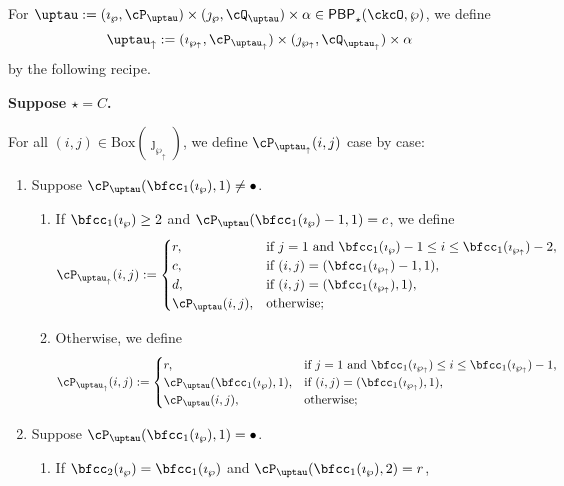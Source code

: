 \documentclass[12pt,a4paper]{amsart}
\numberwithin{equation}{section}
\theoremstyle{remark}
\def\BOX#1{\mathrm{Box}(#1)}
\def\PBP{\mathsf{PBP}}
\def\PBPop#1#2#3#4{\PBP_{#1}^{#2}(#3,#4)}
\newcommand{\PBPOP}[1][]{\PBPop{\star}{#1}{\ckcO}{\wp}}
\def\wpu{\wp_{\uparrow}}
\def\wpd{\wp} %
\def\uptauu{\uptau_{\uparrow}}
\def\uptaud{\uptau} %
\begin{document}
 For
 $\uptau := (\imath_{\wp},\cP_{\uptau})\times (\jmath_{\wp},\cQ_{\uptau})\times \alpha \in \PBPOP $,
 we
 define
 \[
   \uptauu:= (\imath_{\wpu}, \cP_{\uptauu})\times (\jmath_{\wpu},\cQ_{\uptauu})\times \alpha
 \]
 by the following recipe.

 {\bfseries Suppose $\star = C$.}

 \newcommand{\localtextbulletone}{\textcolor{black}{\raisebox{.45ex}{\rule{.6ex}{.6ex}}}}

  For all $(i,j)\in \BOX{\jmath_{\wpu}}$, we define $\cP_{\uptauu}(i,j)$ case by
  case:
 \begin{enumerate}[label=(\alph*)]
   \item Suppose
   $\cP_{\uptaud}(\bfcc_{1}(\imath_{\wpd}),1)\neq \bullet$.
   \begin{enumerate}[label={\localtextbulletone}]
     \item If $\bfcc_{1}(\imath_{\wpd})\geq 2$ and
     $\cP_{\uptau}(\bfcc_{1}(\imath_{\wpd})-1,1) = c$,
     we define
     \[
       \cP_{\uptauu}(i,j) := \begin{cases}
         r ,& \text{if $j=1$ and $\bfcc_{1}(\imath_{\wpd})-1
           \leq i \leq \bfcc_{1}(\imath_{\wpu})-2$},\\
         c ,& \text{if $(i,j)=(\bfcc_{1}(\imath_{\wpu})-1,1)$},\\
         d ,& \text{if $(i,j)=(\bfcc_{1}(\imath_{\wpu}),1)$},\\
         \cP_{\uptaud}(i,j) ,&\text{otherwise};
       \end{cases}
     \]
     \item Otherwise, we define
     \[
       \cP_{\uptauu}(i,j) := \begin{cases}
         r ,& \text{if $j=1$ and $\bfcc_{1}(\imath_{\wpu})
           \leq i \leq \bfcc_{1}(\imath_{\wpu})-1$},\\
         \cP_{\uptaud}(\bfcc_{1}(\imath_{\wpd}),1) ,&
         \text{if $(i,j)=(\bfcc_{1}(\imath_{\wpu}),1)$},\\
         \cP_{\uptaud}(i,j) ,&\text{otherwise};
       \end{cases}
     \]
   \end{enumerate}
   \item Suppose $\cP_{\uptaud}(\bfcc_{1}(\imath_{\wpd}),1)=\bullet$.
   \begin{enumerate}[label={\localtextbulletone}]
     \item If $\bfcc_{2}(\imath_{\wpd}) = \bfcc_{1}(\imath_{\wpd})$
     and
     $\cP_{\uptaud}(\bfcc_{1}(\imath_{\wpd}),2) = r$,

\end{enumerate}
\end{enumerate}
\end{document}

